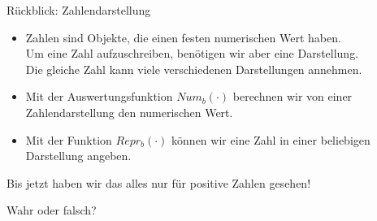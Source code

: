 






\usepackage{graphicx}
\graphicspath{{../figures/}}




\framePrevEpisode

\begin{frame}{Rückblick: Zahlendarstellung}
	\begin{itemize}
		\item Zahlen sind Objekte, die einen festen numerischen Wert haben.\\
			Um eine Zahl aufzuschreiben, benötigen wir aber eine Darstellung. \\
			Die gleiche Zahl kann viele verschiedenen Darstellungen annehmen.
		\item Mit der Auswertungsfunktion $Num_b(\cdot)$ berechnen wir von einer Zahlendarstellung den numerischen Wert.
		\item Mit der Funktion $Repr_b(\cdot)$ können wir eine Zahl in einer beliebigen Darstellung angeben.
	\end{itemize}
	
	Bis jetzt haben wir das alles nur für positive Zahlen gesehen!
\end{frame}

\begin{frame}
	\begin{block}{Wahr oder falsch?}
	\begin{itemize}
	\end{itemize}
	\end{block}	
\end{frame}

